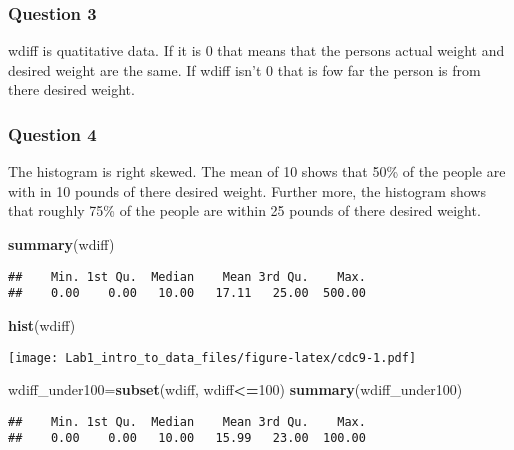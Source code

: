 \documentclass[]{article}
\newenvironment{Shaded}{\begin{snugshade}}{\end{snugshade}}
\newcommand{\DecValTok}[1]{\textcolor[rgb]{0.00,0.00,0.81}{#1}}
\newcommand{\KeywordTok}[1]{\textcolor[rgb]{0.13,0.29,0.53}{\textbf{#1}}}
\newcommand{\NormalTok}[1]{#1}
\newcommand{\OperatorTok}[1]{\textcolor[rgb]{0.81,0.36,0.00}{\textbf{#1}}}
\begin{document}
\hypertarget{question-3-1}{%
\subsubsection{Question 3}\label{question-3-1}}

wdiff is quatitative data. If it is 0 that means that the persons actual
weight and desired weight are the same. If wdiff isn't 0 that is fow far
the person is from there desired weight.

\hypertarget{question-4-1}{%
\subsubsection{Question 4}\label{question-4-1}}

The histogram is right skewed. The mean of 10 shows that 50\% of the
people are with in 10 pounds of there desired weight. Further more, the
histogram shows that roughly 75\% of the people are within 25 pounds of
there desired weight.

\begin{Shaded}
\begin{Highlighting}[]
\KeywordTok{summary}\NormalTok{(wdiff)}
\end{Highlighting}
\end{Shaded}

\begin{verbatim}
##    Min. 1st Qu.  Median    Mean 3rd Qu.    Max. 
##    0.00    0.00   10.00   17.11   25.00  500.00
\end{verbatim}

\begin{Shaded}
\begin{Highlighting}[]
\KeywordTok{hist}\NormalTok{(wdiff)}
\end{Highlighting}
\end{Shaded}

\texttt{[image: Lab1\_intro\_to\_data\_files/figure-latex/cdc9-1.pdf]}

\begin{Shaded}
\begin{Highlighting}[]
\NormalTok{wdiff_under100=}\KeywordTok{subset}\NormalTok{(wdiff, wdiff}\OperatorTok{<=}\DecValTok{100}\NormalTok{)}
\KeywordTok{summary}\NormalTok{(wdiff_under100)}
\end{Highlighting}
\end{Shaded}

\begin{verbatim}
##    Min. 1st Qu.  Median    Mean 3rd Qu.    Max. 
##    0.00    0.00   10.00   15.99   23.00  100.00
\end{verbatim}
\end{document}
